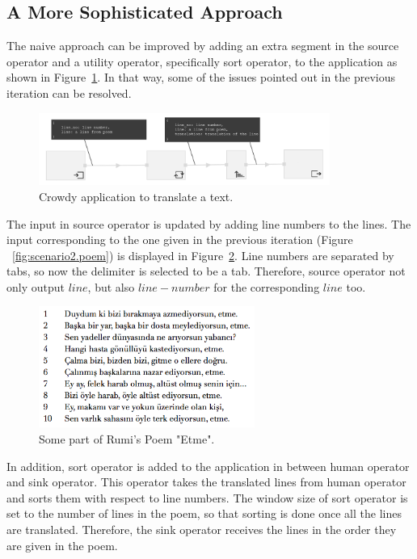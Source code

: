 \subsection{A More Sophisticated Approach}
The naive approach can be improved by adding an extra segment in the source operator and a utility operator, specifically sort operator, to the application as shown in Figure~\ref{fig:scenario2.1}. In that way, some of the issues pointed out in the previous iteration can be resolved.

\begin{figure}[ht]
	\centering
	\includegraphics[width=0.85\textwidth]{figures/scenarios/scenario2_2a.png}
	\caption{Crowdy application to translate a text.}
	\label{fig:scenario2.1}
\end{figure}

The input in source operator is updated by adding line numbers to the lines. The input corresponding to the one given in the previous iteration (Figure ~\ref{fig:scenario2.poem}) is displayed in Figure~\ref{fig:scenario2.poem2}. Line numbers are separated by tabs, so now the delimiter is selected to be a tab. Therefore, source operator not only output $line$, but also $line-number$ for the corresponding $line$ too.

\begin{figure}[ht]
	\centering
	\includegraphics[height=150px]{figures/scenarios/poem2.png}
	\caption{Some part of Rumi's Poem "Etme".}
	\label{fig:scenario2.poem2}
\end{figure}

In addition, sort operator is added to the application in between human operator and sink operator. This operator takes the translated lines from human operator and sorts them with respect to line numbers. The window size of sort operator is set to the number of lines in the poem, so that sorting is done once all the lines are translated. Therefore, the sink operator receives the lines in the order they are given in the poem.

